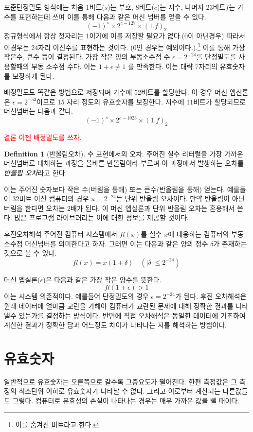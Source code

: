 \documentclass[a4paper, 11pt]{report}
\theoremstyle{definition}
\newtheorem*{defn}{Definition}
\begin{document}
표준단정밀도 형식에는 처음 1비트($s$)는 부호, 8비트($c$)는 지수, 나머지 23비트$f$는 가수를 표현하는데 쓰며 이를 통해
다음과 같은 머신 넘버를 얻을 수 있다.
\[
    (-1)^s\times 2^{c-127}\times(1.f)_2
\]
정규형식에서 항상 첫자리는 1이기에 이를 저장할 필요가 없다.(0이 아닌경우) 따라서 이경우는 24자리 이진수를 표현하는 것이다.
(0인 경우는 예외이다.).\footnote{이를 숨겨진 비트라고 한다.} 이를 통해 가장 작은수, 큰수 등이 결정된다.
가장 작은 양의 부동소수점 수 $\epsilon = 2^{-24}$를 단정밀도를 사용할때의 부동 소수점 수다. 이는 $1+\epsilon \neq 1$
를 만족한다. 이는 대략 7자리의 유효숫자를 보장하게 된다.

배정밀도도 똑같은 방법으로 저장되며 가수에 52비트를 할당한다. 이 경우 머신 엡신론은 $\epsilon = 2^{-53}$이므로 15
자리 정도의 유효숫자를 보장한다. 지수에 11비트가 할당되므로 머신넘버는 다음과 같다.
\[
    (-1)^s\times 2^{c-1023}\times(1.f)_2
\]

\textcolor{Red}{결론 이젠 배정밀도를 쓰자.}

\begin{defn}[반올림오차]
    수 표현에서의 오차. 주어진 실수 리터럴을 가장 가까운 머신넘버로 대체하는 과정을 올바른 반올림이라 부르며
이 과정에서 발생하는 오차를 \emph{반올림 오차}라고 한다. 
\end{defn}

이는 주어진 숫자보다 작은 수(버림을 통해) 또는 큰수(반올림을 통해) 얻는다.
예를들어 32비트 이진 컴퓨터의 경우 $u=2^{-24}$는 단위 반올림 오차이다.
만약 반올림이 아닌 버림을 한다면 오차는 2배가 된다. 이 머신 엡실론과 단위 반올림 오차는 혼용해서 쓴다. 많은
프로그램 라이브러리는 이에 대한 정보를 제공할 것이다.

후진오차해석
주어진 컴퓨터 시스템에서 $fl(x)$를 실수 $x$에 대응하는 컴퓨터의
부동소수점 머신넘버를 의미한다고 하자. 그러면 이는 다음과 같은 양의 정수 $\delta$가 존재하는 것으로 볼 수 있다.
\[
    fl(x) = x(1+\delta) \quad (|\delta| \leq 2^{-24})
\]

머신 엡실론($\epsilon$)은 다음과 같은 가장 작은 양수를 뜻한다.
\[
    fl(1+\epsilon) > 1
\]
이는 시스템 의존적이다. 예를들어  단정밀도의 경우 $\epsilon = 2^{-24} $가 된다. 
후진 오차해석은 원래 데이터에 얼마큼 교란을 가해야 컴퓨터가 교란된 문제에 대해 정확한 결과를 나타낼수 있는가를
결정하는 방식이다. 반면에 직접 오차해석은 동일한 데이터에 기초하여 계산한 결과가 정확한 답과 어느정도 차이가 나타나는
지를 해석하는 방법이다.
\section{유효숫자}
일반적으로 유효숫자는 오른쪽으로 갈수록 그중요도가 떨어진다. 한편 측정값은 그 측정의 최소단위 이하로 유효숫자가 나타날
수 없다. 그리고 이로부터 계산되는 다른값들도 그렇다. 
컴퓨터로 유효성의 손실이 나타나는 경우는 매우 가까운 값을 뺄 때이다.
\end{document}

